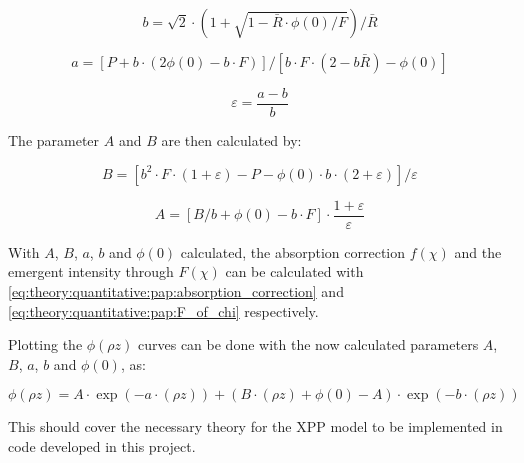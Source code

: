 \begin{equation}
    \label{eq:theory:quantitative:pap:small_b}
    b = \sqrt{2} \cdot (1 + \sqrt{1 - \bar{R} \cdot \phi(0) / F})/\bar{R}
\end{equation}

\begin{equation}
    \label{eq:theory:quantitative:pap:small_a}
    a = [P + b \cdot (2\phi(0) - b \cdot F)] / [b \cdot F \cdot (2 - b \bar{R}) - \phi(0)]
\end{equation}

\begin{equation}
    \label{eq:theory:quantitative:pap:epsilon}
    \varepsilon = \frac{a-b}{b}
\end{equation}



The parameter $A$ and $B$ are then calculated by:

\begin{equation}
    \label{eq:theory:quantitative:pap:big_B}
    B = [b^2 \cdot F \cdot (1 + \varepsilon) - P - \phi(0) \cdot b \cdot (2+\varepsilon) ] / \varepsilon
\end{equation}

\begin{equation}
    \label{eq:theory:quantitative:pap:big_A}
    A = [B/b + \phi(0) - b \cdot F] \cdot \frac{1+ \varepsilon}{\varepsilon}
\end{equation}


With $A$, $B$, $a$, $b$ and $\phi(0)$ calculated, the absorption correction $f(\chi)$ and the emergent intensity through $F(\chi)$ can be calculated with \cref{eq:theory:quantitative:pap:absorption_correction} and \cref{eq:theory:quantitative:pap:F_of_chi} respectively.

Plotting the $\phi(\rho z)$ curves can be done with the now calculated parameters $A$, $B$, $a$, $b$ and $\phi(0)$, as:

\begin{equation}
    \label{eq:theory:quantitative:pap:phi_of_rho_z}
    \phi (\rho z) = A \cdot \exp(- a \cdot (\rho z)) + (B \cdot (\rho z) + \phi(0) - A) \cdot \exp(- b \cdot (\rho z))
\end{equation}


This should cover the necessary theory for the XPP model to be implemented in code developed in this project.